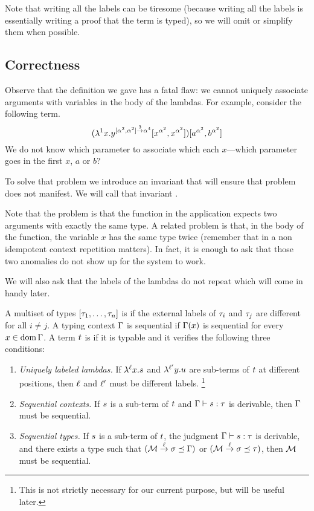 Note that writing all the labels can be tiresome
(because writing all the labels is essentially writing a proof that the term is typed),
so we will omit or simplify them when possible.

\subsection*{Correctness}
Observe that the definition we gave has a fatal flaw:
we cannot uniquely associate arguments with variables in the body of the lambdas.
For example, consider the following term.
\[(\lambda^{1} x. y^{[\alpha^2, \alpha^2] \overset{3}{\to} \alpha^4} [x^{\alpha^2}, x^{\alpha^2}])
[a^{\alpha^2}, b^{\alpha^2}]\]
We do not know which parameter to associate which each $x$---which parameter goes in the first $x$, $a$ or $b$?

To solve that problem we introduce an invariant that will ensure
that problem does not manifest.
We will call that invariant .

Note that the problem is that the function in the application expects two arguments
with exactly the same type. A related problem is that, in the body of the function,
the variable $x$ has the same type twice (remember that in a non idempotent context repetition matters).
In fact, it is enough to ask that those two anomalies do not show up for the system to work.

We will also ask that the labels of the lambdas do not repeat which
will come in handy later.

\begin{definition}
A multiset of types $[\tau_1,\hdots,\tau_n]$ is 
if the external labels of $\tau_i$ and $\tau_j$ are different for all $i \neq j$.
A typing context $\Gamma$ is sequential if $\Gamma(x)$ is sequential for every $x \in \operatorname{dom}\Gamma$.
A term $t$ is  if it is typable and it verifies the following three conditions:
\begin{enumerate}
\item {\em Uniquely labeled lambdas.}
  If $\lambda^{\ell} x. s$ and $\lambda^{\ell'} y. u$
  are sub-terms of $t$ at different positions, then $\ell$ and $\ell'$
  must be different labels.
  \footnote{This is not strictly necessary for our current purpose, but will be useful later.}
\item {\em Sequential contexts.}
  If $s$ is a sub-term of $t$ and $\Gamma \vdash s : \tau$
  is derivable, then $\Gamma$ must be sequential.
\item {\em Sequential types.}
  If $s$ is a sub-term of $t$,
  the judgment $\Gamma \vdash s : \tau$ is derivable,
  and there exists a type such that
  $(\mathcal{M} \overset{\ell}{\to} \sigma \preceq \Gamma)$ or $(\mathcal{M} \overset{\ell}{\to} \sigma \preceq \tau)$,
  then $\mathcal{M}$ must be sequential.
\end{enumerate}
\end{definition}

